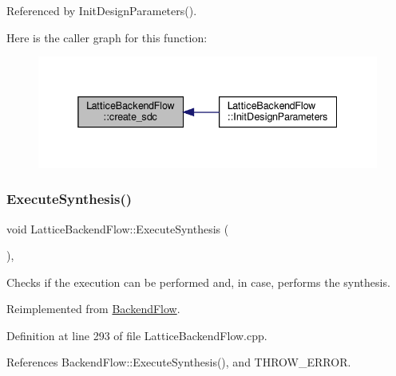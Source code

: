 Referenced by Init\+Design\+Parameters().

Here is the caller graph for this function\+:
\nopagebreak
\begin{figure}[H]
\begin{center}
\leavevmode
\includegraphics[width=338pt]{de/dd0/classLatticeBackendFlow_a18902a5390c3be6efb6833d35f0f1d23_icgraph}
\end{center}
\end{figure}
\mbox{\label{classLatticeBackendFlow_adc9bf997d1ac830c4511521b1934bffc}} 
\subsubsection{\texorpdfstring{Execute\+Synthesis()}{ExecuteSynthesis()}}
{\footnotesize\ttfamily void Lattice\+Backend\+Flow\+::\+Execute\+Synthesis (\begin{DoxyParamCaption}{ }\end{DoxyParamCaption})\hspace{0.3cm}{\ttfamily [override]}, {\ttfamily [virtual]}}



Checks if the execution can be performed and, in case, performs the synthesis. 



Reimplemented from \hyperlink{classBackendFlow_af0e8f1973185540298eaa3ac4bee3b2c}{Backend\+Flow}.



Definition at line 293 of file Lattice\+Backend\+Flow.\+cpp.



References Backend\+Flow\+::\+Execute\+Synthesis(), and T\+H\+R\+O\+W\+\_\+\+E\+R\+R\+OR.

